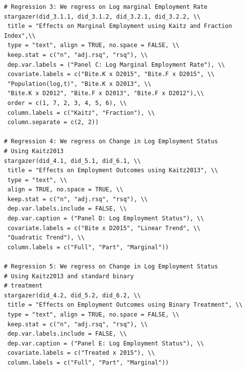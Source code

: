 \documentclass[a4paper]{article}
\begin{document}
{\begin{lstlisting}
# Regression 3: We regress on Log marginal Employment Rate
stargazer(did_3.1.1, did_3.1.2, did_3.2.1, did_3.2.2, \\ 
 title = "Effects on Marginal Employment using Kaitz and Fraction Index",\\ 
 type = "text", align = TRUE, no.space = FALSE, \\ 
 keep.stat = c("n", "adj.rsq", "rsq"), \\ 
 dep.var.labels = ("Panel C: Log Marginal Employment Rate"), \\ 
 covariate.labels = c("Bite.K x D2015", "Bite.F x D2015", \\ 
 "Population(log,t)", "Bite.K x D2013", \\ 
 "Bite.K x D2012", "Bite.F x D2013", "Bite.F x D2012"),\\ 
 order = c(1, 7, 2, 3, 4, 5, 6), \\ 
 column.labels = c("Kaitz", "Fraction"), \\ 
 column.separate = c(2, 2))

# Regression 4: We regress on Change in Log Employment Status 
# Using Kaitz2013
stargazer(did_4.1, did_5.1, did_6.1, \\ 
 title = "Effects on Employment Outcomes using Kaitz2013", \\ 
 type = "text", \\ 
 align = TRUE, no.space = TRUE, \\ 
 keep.stat = c("n", "adj.rsq", "rsq"), \\ 
 dep.var.labels.include = FALSE, \\ 
 dep.var.caption = ("Panel D: Log Employment Status"), \\ 
 covariate.labels = c("Bite x D2015", "Linear Trend", \\ 
 "Quadratic Trend"), \\ 
 column.labels = c("Full", "Part", "Marginal"))

# Regression 5: We regress on Change in Log Employment Status 
# Using Kaitz2013 and standard binary
# treatment
stargazer(did_4.2, did_5.2, did_6.2, \\ 
 title = "Effects on Employment Outcomes using Binary Treatment", \\ 
 type = "text", align = TRUE, no.space = FALSE, \\ 
 keep.stat = c("n", "adj.rsq", "rsq"), \\ 
 dep.var.labels.include = FALSE, \\ 
 dep.var.caption = ("Panel E: Log Employment Status"), \\ 
 covariate.labels = c("Treated x 2015"), \\ 
 column.labels = c("Full", "Part", "Marginal"))


\end{lstlisting}}
\end{document}
